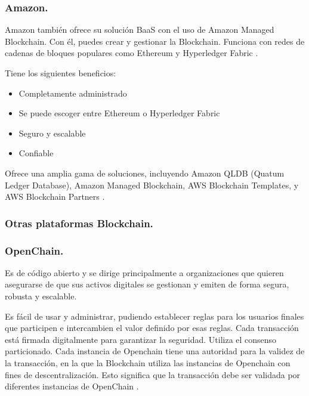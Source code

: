 \subsubsection*{Amazon.}

Amazon también ofrece su solución BaaS con el uso de Amazon Managed Blockchain. Con él, puedes crear y gestionar la 
Blockchain. Funciona con redes de cadenas de bloques populares como Ethereum y Hyperledger Fabric 
\cite{top-blockchain-platforms}.

\vspace{5mm}

\noindent Tiene los siguientes beneficios:

\begin{itemize}
    \item Completamente administrado
    \item Se puede escoger entre Ethereum o Hyperledger Fabric
    \item Seguro y escalable
    \item Confiable
\end{itemize}

\noindent Ofrece una amplia gama de soluciones, incluyendo Amazon QLDB (Quatum Ledger Database), Amazon Managed 
Blockchain, AWS Blockchain Templates, y AWS Blockchain Partners \cite{top-blockchain-platforms}.

\subsubsection{Otras plataformas Blockchain.}

\subsubsection*{OpenChain.}

Es de código abierto y se dirige principalmente a organizaciones que quieren asegurarse de que sus activos digitales
se gestionan y emiten de forma segura, robusta y escalable.

\vspace{5mm}

\noindent Es fácil de usar y administrar, pudiendo establecer reglas para los usuarios finales que participen e 
intercambien el valor definido por esas reglas. Cada transacción está firmada digitalmente para garantizar la 
seguridad. Utiliza el consenso particionado. Cada instancia de Openchain tiene una autoridad para la validez de 
la transacción, en la que la Blockchain utiliza las instancias de Openchain con fines de descentralización. Esto 
significa que la transacción debe ser validada por diferentes instancias de OpenChain \cite{top-blockchain-platforms}.

